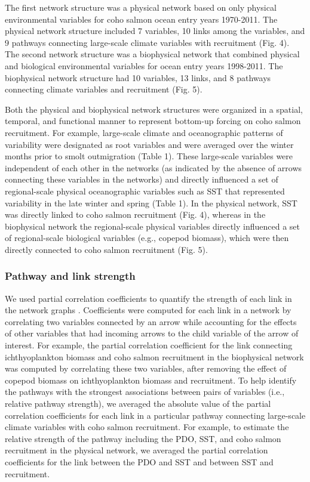 The first network structure was a physical network based on only physical
environmental variables for coho salmon ocean entry years 1970-2011. The
physical network structure included 7 variables, 10 links among the variables,
and 9 pathways connecting large-scale climate variables with recruitment (Fig.
4). The second network structure was a biophysical network that combined
physical and biological environmental variables for ocean entry years 1998-2011.
The biophysical network structure had 10 variables, 13 links, and 8 pathways
connecting climate variables and recruitment (Fig. 5).

Both the physical and biophysical network structures were organized in a
spatial, temporal, and functional manner to represent bottom-up forcing on coho
salmon recruitment. For example, large-scale climate and oceanographic patterns
of variability were designated as root variables and were averaged over the
winter months prior to smolt outmigration (Table 1). These large-scale variables
were independent of each other in the networks (as indicated by the absence of
arrows connecting these variables in the networks) and directly influenced a set
of regional-scale physical oceanographic variables such as SST that represented
variability in the late winter and spring (Table 1). In the physical network,
SST was directly linked to coho salmon recruitment (Fig. 4), whereas in the
biophysical network the regional-scale physical variables directly influenced a
set of regional-scale biological variables (e.g., copepod biomass), which were
then directly connected to coho salmon recruitment (Fig. 5).


\subsubsection{Pathway and link strength}

We used partial correlation coefficients to quantify the strength of each link
in the network graphs \citep{Zar1999a, Scutari2010, Yang2011}.  Coefficients
were computed for each link in a network by correlating two variables connected
by an arrow while accounting for the effects of other variables that had
incoming arrows to the child variable of the arrow of interest. For example, the
partial correlation coefficient for the link connecting ichthyoplankton biomass
and coho salmon recruitment in the biophysical network was computed by
correlating these two variables, after removing the effect of copepod biomass on
ichthyoplankton biomass and recruitment. To help identify the pathways with the
strongest associations between pairs of variables (i.e., relative pathway
strength), we averaged the absolute value of the partial correlation
coefficients for each link in a particular pathway connecting large-scale
climate variables with coho salmon recruitment.  For example, to estimate the
relative strength of the pathway including the PDO, SST, and coho salmon
recruitment in the physical network, we averaged the partial correlation
coefficients for the link between the PDO and SST and between SST and
recruitment.


